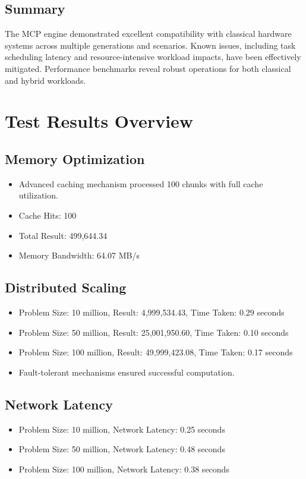 \documentclass{article}
\theoremstyle{plain}
\begin{document}
\subsection{Summary}
The MCP engine demonstrated excellent compatibility with classical hardware systems across multiple generations and scenarios. Known issues, including task scheduling latency and resource-intensive workload impacts, have been effectively mitigated. Performance benchmarks reveal robust operations for both classical and hybrid workloads.

\section{Test Results Overview}

\subsection{Memory Optimization}
\begin{itemize}
    \item Advanced caching mechanism processed 100 chunks with full cache utilization.
    \item Cache Hits: 100
    \item Total Result: 499,644.34
    \item Memory Bandwidth: 64.07 MB/s
\end{itemize}

\subsection{Distributed Scaling}
\begin{itemize}
    \item Problem Size: 10 million, Result: 4,999,534.43, Time Taken: 0.29 seconds
    \item Problem Size: 50 million, Result: 25,001,950.60, Time Taken: 0.10 seconds
    \item Problem Size: 100 million, Result: 49,999,423.08, Time Taken: 0.17 seconds
    \item Fault-tolerant mechanisms ensured successful computation.
\end{itemize}

\subsection{Network Latency}
\begin{itemize}
    \item Problem Size: 10 million, Network Latency: 0.25 seconds
    \item Problem Size: 50 million, Network Latency: 0.48 seconds
    \item Problem Size: 100 million, Network Latency: 0.38 seconds
\end{itemize}
\end{document}
